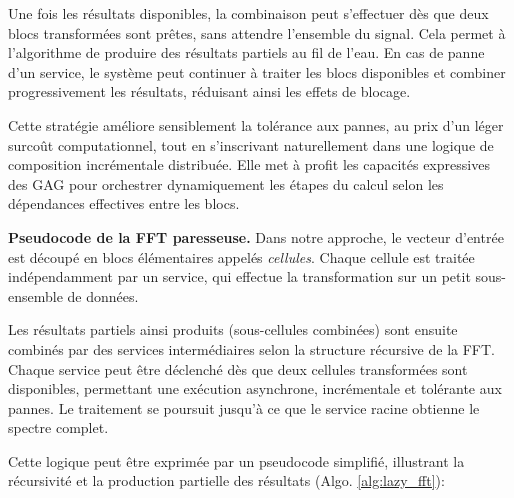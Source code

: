 Une fois les résultats disponibles, la combinaison peut s’effectuer dès que deux blocs transformées sont prêtes, sans attendre l’ensemble du signal. Cela permet à l’algorithme de produire des résultats partiels au fil de l’eau. En cas de panne d’un service, le système peut continuer à traiter les blocs disponibles et combiner progressivement les résultats, réduisant ainsi les effets de blocage.

Cette stratégie améliore sensiblement la tolérance aux pannes, au prix d'un léger surcoût computationnel, tout en s’inscrivant naturellement dans une logique de composition incrémentale distribuée. Elle met à profit les capacités expressives des GAG pour orchestrer dynamiquement les étapes du calcul selon les dépendances effectives entre les blocs.

\textbf{Pseudocode de la FFT paresseuse.}
Dans notre approche, le vecteur d’entrée est découpé en blocs élémentaires appelés \textit{cellules}. Chaque cellule est traitée indépendamment par un service, qui effectue la transformation sur un petit sous-ensemble de données.

Les résultats partiels ainsi produits (sous-cellules combinées) sont ensuite combinés par des services intermédiaires selon la structure récursive de la FFT. Chaque service peut être déclenché dès que deux cellules transformées sont disponibles, permettant une exécution asynchrone, incrémentale et tolérante aux pannes. Le traitement se poursuit jusqu’à ce que le service racine obtienne le spectre complet.


Cette logique peut être exprimée par un pseudocode simplifié, illustrant la récursivité et la production partielle des résultats (Algo. \ref{alg:lazy_fft}):



